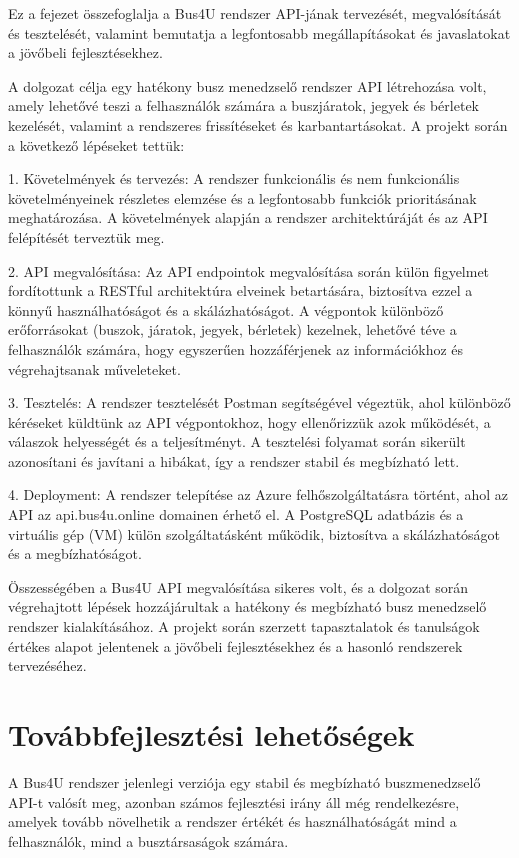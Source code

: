 Ez a fejezet összefoglalja a Bus4U rendszer API-jának tervezését, megvalósítását és tesztelését, valamint bemutatja a legfontosabb megállapításokat és javaslatokat a jövőbeli fejlesztésekhez.

A dolgozat célja egy hatékony busz menedzselő rendszer API létrehozása volt, amely lehetővé teszi a felhasználók számára a buszjáratok, jegyek és bérletek kezelését, valamint a rendszeres frissítéseket és karbantartásokat. A projekt során a következő lépéseket tettük:

1. Követelmények és tervezés: A rendszer funkcionális és nem funkcionális követelményeinek részletes elemzése és a legfontosabb funkciók prioritásának meghatározása. A követelmények alapján a rendszer architektúráját és az API felépítését terveztük meg.

2. API megvalósítása: Az API endpointok megvalósítása során külön figyelmet fordítottunk a RESTful architektúra elveinek betartására, biztosítva ezzel a könnyű használhatóságot és a skálázhatóságot. A végpontok különböző erőforrásokat (buszok, járatok, jegyek, bérletek) kezelnek, lehetővé téve a felhasználók számára, hogy egyszerűen hozzáférjenek az információkhoz és végrehajtsanak műveleteket.

3. Tesztelés: A rendszer tesztelését Postman segítségével végeztük, ahol különböző kéréseket küldtünk az API végpontokhoz, hogy ellenőrizzük azok működését, a válaszok helyességét és a teljesítményt. A tesztelési folyamat során sikerült azonosítani és javítani a hibákat, így a rendszer stabil és megbízható lett.

4. Deployment: A rendszer telepítése az Azure felhőszolgáltatásra történt, ahol az API az api.bus4u.online domainen érhető el. A PostgreSQL adatbázis és a virtuális gép (VM) külön szolgáltatásként működik, biztosítva a skálázhatóságot és a megbízhatóságot.

Összességében a Bus4U API megvalósítása sikeres volt, és a dolgozat során végrehajtott lépések hozzájárultak a hatékony és megbízható busz menedzselő rendszer kialakításához. A projekt során szerzett tapasztalatok és tanulságok értékes alapot jelentenek a jövőbeli fejlesztésekhez és a hasonló rendszerek tervezéséhez.

\section{Továbbfejlesztési lehetőségek}

A Bus4U rendszer jelenlegi verziója egy stabil és megbízható buszmenedzselő API-t valósít meg, azonban számos fejlesztési irány áll még rendelkezésre, amelyek tovább növelhetik a rendszer értékét és használhatóságát mind a felhasználók, mind a busztársaságok számára.

